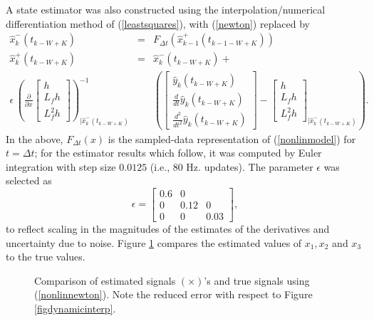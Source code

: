 A state estimator was also constructed using the interpolation/numerical
differentiation method of (\ref{leastsquares}), with  (\ref{newton}) replaced by 
\begin{eqnarray}
\hat{x}_{k}^{-}(t_{k-W+K}) & = & F_{\Delta t}(\hat{x}_{k-1}^{+}(t_{k-1-W+K}))
\nonumber \\
\hat{x}_{k}^{+}(t_{k-W+K}) & = & \hat{x}_{k}^{-}(t_{k-W+K})+ \label{nonlinnewton} \\ 
\epsilon \, (\frac{\partial}{\partial x}
\left[ \begin{array}{l} h \\ L_fh \\ L_f^2h \end{array} 
\right]) ^{-1}_{|\hat{x}_{k}^{-}(t_{k-W+K})} & & ( \left[ \begin{array}{r} 
\hat{y}_{k}(t_{k-W+K}) \\
\frac{d}{dt} \hat{y}_{k}(t_{k-W+K}) \\ 
\frac{d^{2}}{dt^{2}} \hat{y}_{k}(t_{k-W+K}) \end{array} \right] - 
\left[ \begin{array}{l} h \\ L_fh \\ L_f^2h \end{array} 
\right]_{| \hat{x}_{k}^{-}(t_{k-W+K})} ). \nonumber
\end{eqnarray}
In the above, $F_{\Delta t}(x)$ is the 
sampled-data representation of (\ref{nonlinmodel}) for $t=\Delta t$; for the
estimator results which follow, it was computed by Euler
integration with step size $0.0125$ (i.e., 80 Hz. updates).
The parameter $\epsilon$ was selected as
$$ \epsilon = \left[ \begin{array}{ccc}
0.6 & 0 & \\
0 & 0.12 & 0 \\
0 & 0 & 0.03  \end{array} \right], $$ to reflect scaling in the
magnitudes of the estimates of the derivatives and uncertainty due to noise.
Figure \ref{figdynamicnewton} compares the estimated values
of $x_1, x_2$ and $x_3$ to the true values.



\begin{figure}[hbt]
\centerline{}
\smallskip
\caption{Comparison of estimated signals $(\times)$'s and true
signals using (\protect\ref{nonlinnewton}).  Note the reduced error with
respect to Figure \protect\ref{figdynamicinterp}. }
\label{figdynamicnewton}
\end{figure}


